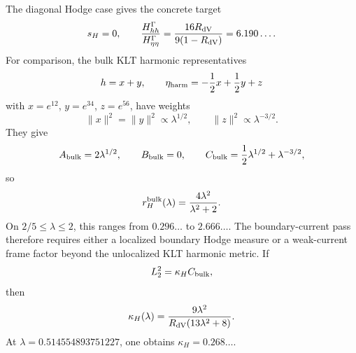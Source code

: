\documentclass[11pt]{article}
\theoremstyle{definition}
\theoremstyle{remark}
\begin{document}
The diagonal Hodge case gives the concrete target
\[
  s_H=0,\qquad
  \frac{H_{hh}^\Gamma}{H_{\eta\eta}^\Gamma}
  =
  \frac{16R_{\rm dV}}{9(1-R_{\rm dV})}
  =
  6.190\ldots .
\]
For comparison, the bulk KLT harmonic representatives
\[
  h=x+y,\qquad
  \eta_{\rm harm}=-\frac12x+\frac12y+z
\]
with \(x=e^{12}\), \(y=e^{34}\), \(z=e^{56}\), have weights
\[
  \|x\|^2=\|y\|^2\propto\lambda^{1/2},
  \qquad
  \|z\|^2\propto\lambda^{-3/2}.
\]
They give
\[
  A_{\rm bulk}=2\lambda^{1/2},\qquad
  B_{\rm bulk}=0,\qquad
  C_{\rm bulk}=\frac12\lambda^{1/2}+\lambda^{-3/2},
\]
so
\[
  r_H^{\rm bulk}(\lambda)
  =
  \frac{4\lambda^2}{\lambda^2+2}.
\]
On \(2/5\leq\lambda\leq2\), this ranges from \(0.296\ldots\) to
\(2.666\ldots\).  The boundary-current pass therefore requires either a
localized boundary Hodge measure or a weak-current frame factor beyond the
unlocalized KLT harmonic metric.  If
\[
  L_2^2=\kappa_H C_{\rm bulk},
\]
then
\[
  \kappa_H(\lambda)
  =
  \frac{9\lambda^2}{R_{\rm dV}(13\lambda^2+8)}.
\]
At \(\lambda=0.514554893751227\), one obtains \(\kappa_H=0.268\ldots\).
\end{document}
